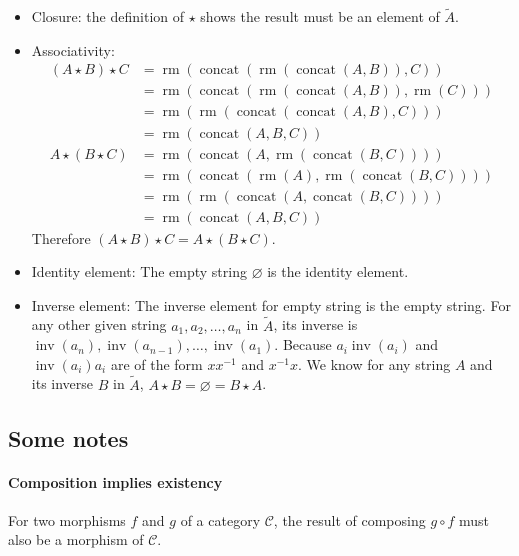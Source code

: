 \documentclass[11pt]{article}
\begin{document}
\begin{itemize}
  \item{Closure}: the definition of $\star$ shows the result must be
    an element of $\tilde{A}$.
  \item{Associativity}:
    \begin{align*}
      (A \star B) \star C
      & = \mathop{rm}(\mathop{concat}(\mathop{rm}({\mathop{concat}}(A,B)),C)) \\
      & = \mathop{rm}(\mathop{concat}(\mathop{rm}({\mathop{concat}}(A,B)),\mathop{rm}(C))) \\
      & = \mathop{rm}(\mathop{rm}(\mathop{concat}(\mathop{concat}(A,B),C))) \\
      & = \mathop{rm}(\mathop{concat}(A,B,C)) \\
      A \star (B \star C)
      & = \mathop{rm}(\mathop{concat}(A,\mathop{rm}({\mathop{concat}}(B,C)))) \\
      & = \mathop{rm}(\mathop{concat}(\mathop{rm}(A),\mathop{rm}({\mathop{concat}}(B,C)))) \\
      & = \mathop{rm}(\mathop{rm}(\mathop{concat}(A,\mathop{concat}(B,C)))) \\
      & = \mathop{rm}(\mathop{concat}(A,B,C))
    \end{align*}
    Therefore $(A \star B) \star C = A \star (B \star C)$.
  \item{Identity element}:
    The empty string $\varnothing$ is the identity element.
  \item{Inverse element}:
    The inverse element for empty string is the empty string.
    For any other given string $a_1,a_2,\ldots,a_n$ in $\tilde{A}$,
    its inverse is $\mathop{inv}(a_n),\mathop{inv}(a_{n-1}),\ldots,\mathop{inv}(a_1)$.
    Because $a_i\mathop{inv}(a_i)$ and $\mathop{inv}(a_i)a_i$ are of the form
    $xx^{-1}$ and $x^{-1}x$. We know for any string $A$ and its inverse $B$ in $\tilde{A}$,
    $A \star B = \varnothing = B \star A$.
\end{itemize}

\subsection{Some notes}

\paragraph{Composition implies existency}
For two morphisms $f$ and $g$ of a category $\mathcal{C}$, the result of composing $g \circ f$
must also be a morphism of $\mathcal{C}$.
\end{document}
